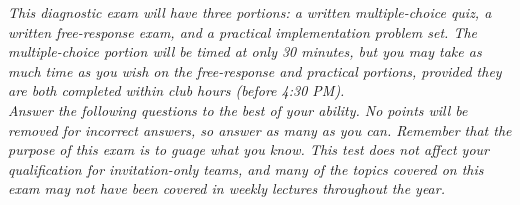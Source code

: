 \documentclass[11pt,addpoints]{exam}
\begin{document}
\noindent
\textit{This diagnostic exam will have three portions: a written multiple-choice quiz, a written free-response exam, and a practical implementation problem set. The multiple-choice portion will be timed at only 30 minutes, but you may take as much time as you wish on the free-response and practical portions, provided they are both completed within club hours (before 4:30 PM).} \\

\noindent
\textit{Answer the following questions to the best of your ability. No points will be removed for incorrect answers, so answer as many as you can. Remember that the purpose of this exam is to guage what you know. This test does not affect your qualification for invitation-only teams, and many of the topics covered on this exam may not have been covered in weekly lectures throughout the year.}
\end{document}
